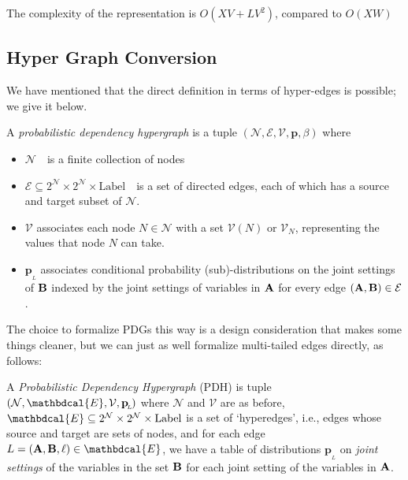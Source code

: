 \documentclass{article}
\theoremstyle{plain}
\theoremstyle{definition}
\theoremstyle{remark}
\newcommand{\note}[1]{{\color{blue}\ \!\Large\smash{\textbf{[}}{\normalsize\textsc{note:} #1}\ \!\smash{\textbf{]}}}}
\newcommand\mat[1]{\mathbf{#1}}
\newcommand{\bp}[1][L]{\mat{p}_{\!_{#1}\!}}
\newcommand{\V}{\mathcal V}
\newcommand{\N}{\mathcal N}
\newcommand{\Ed}{\mathcal E}
\newcommand{\pdgvars}[1][]{(\N#1, \Ed#1, \V#1, \mat p#1, \beta#1)}
\newcommand{\modelnamehyper}{probabilistic dependency hypergraph}
\numberwithin{equation}{section}
\begin{document}
{{The complexity of the representation is $O(XV + L V^2)$, compared to $O(XW)$}

\subsection{Hyper Graph Conversion}\label{sec:hyper-convert}
We have mentioned that the direct definition in terms of hyper-edges is possible; we give it below.

\begin{defn}[PDH]\label{def:hypermodel}
	A \emph{\modelnamehyper} is a tuple $\pdgvars[]$ where
	\begin{itemize}[nosep]
		\item $\N$~~is a finite collection of nodes
		\item $\Ed \subseteq 2^{\N} \times 2^{\N} \times \mathrm{Label}$~~is a set of directed edges, each of which has a source and target subset of $\N$.
		\item $\V$ associates each node $N \in \mathcal N$ with a set $\V(N)$ or $\V_N$, representing the values that node $N$ can take.
		\item $\bp$
		associates conditional probability (sub)-distributions on the joint settings of $\bf B$ indexed by the joint settings of variables in $\bf A$ for every edge $({\bf A,B}) \in \Ed$. %
	\end{itemize}
\end{defn}

	
The choice to formalize PDGs this way is a design consideration that makes some things cleaner, but we can just as well formalize multi-tailed edges directly, as follows:

\begin{defn}[PDH]\label{def:modelhyper}
A \textit{Probabilistic Dependency Hypergraph} (PDH) is tuple $(\N,
\mathbdcal{E}, \V, \bp)$ where $\N$ and $\V$ are as before, $\mathbdcal{E}
\subseteq 2^\N \times 2^\N \times \mathrm{Label}$ is a set of `hyperedges',
i.e., edges whose source and target are sets of nodes, and for each edge $L
= ({\bf A, B}, \ell) \in \mathbdcal{E}$, we have a table of distributions
$\bp$ on \emph{joint settings} of the variables in the set $\bf B$ for each
joint setting of the variables in $\bf A$.
\end{defn}

}
\end{document}

